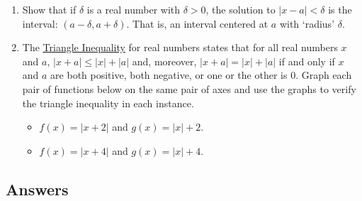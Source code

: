 \begin{enumerate}
\setcounter{enumi}{\value{HW}}

\item  Show that if $\delta$ is a real number with $\delta > 0$, the solution to $|x-a| < \delta$ is the interval:  $(a - \delta, a + \delta)$.  That is, an interval centered at $a$ with `radius' $\delta$.

\item  \label{triangleinequalityreals}  The \href{http://en.wikipedia.org/wiki/Triangle_inequality}{\underline{Triangle Inequality}}  for real numbers states that for all real numbers $x$ and $a$, $|x+a| \leq |x| + |a|$ and, moreover, $|x+a| = |x|+|a|$ if and only if $x$ and $a$ are both positive, both negative, or one or the other is $0$.  Graph each pair of functions below on the same pair of axes and use the graphs to verify the triangle inequality in each instance.

\enlargethispage{0.25in}

\begin{multicols}{2}

\begin{itemize}

\item  $f(x) = |x+2|$ and $g(x) = |x|+2$.

\item  $f(x) = |x+4|$ and $g(x) = |x|+4$.

\end{itemize}

\end{multicols}

 
 \setcounter{HW}{\value{enumi}}
\end{enumerate}




\newpage


\subsection{Answers}

